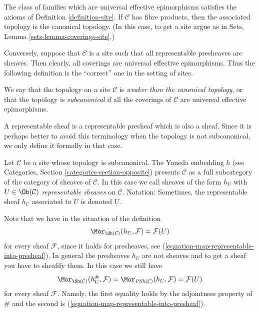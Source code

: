 \noindent
The class of families which are universal effective epimorphisms
satisfies the axioms of Definition \ref{definition-site}.
If $\mathcal{C}$ has fibre products, then the associated topology is
the canonical topology. (In this case, to get a site argue as in Sets,
Lemma \ref{sets-lemma-coverings-site}.)

\medskip\noindent
Conversely, suppose that $\mathcal{C}$ is a site such that
all representable presheaves are sheaves. Then clearly, all
coverings are universal effective epimorphisms.
Thus the following definition is the ``correct'' one in the
setting of sites.

\begin{definition}
\label{definition-weaker-than-canonical}
We say that the topology on a site $\mathcal{C}$ is
{\it weaker than the canonical topology}, or that the topology is
{\it subcanonical} if all the coverings
of $\mathcal{C}$ are universal effective epimorphisms.
\end{definition}

\noindent
A representable sheaf is a representable presheaf which is also a
sheaf. Since it is perhaps better to avoid this terminology when the
topology is not subcanonical, we only define it formally in that case.

\begin{definition}
\label{definition-representable-sheaf}
Let $\mathcal{C}$ be a site whose topology is subcanonical.
The Yoneda embedding $h$ (see
Categories, Section \ref{categories-section-opposite})
presents $\mathcal{C}$ as a full subcategory of the
category of sheaves of $\mathcal{C}$. In this case
we call sheaves of the form $h_U$ with $U \in \Ob(\mathcal{C})$
{\it representable sheaves} on $\mathcal{C}$.
Notation: Sometimes, the representable sheaf $h_U$ associated to $U$ is
denoted {\it $\underline{U}$}.
\end{definition}

\noindent
Note that we have in the situation of the definition
$$
\Mor_{\Sh(\mathcal{C})}(h_U, \mathcal{F}) = \mathcal{F}(U)
$$
for every sheaf $\mathcal{F}$, since it holds for presheaves, see
(\ref{equation-map-representable-into-presheaf}). In general the
presheaves $h_U$ are not sheaves and to get a sheaf you have to
sheafify them. In this case we still have
\begin{equation}
\label{equation-map-representable-into-sheaf}
\Mor_{\Sh(\mathcal{C})}(h_U^\#, \mathcal{F}) =
\Mor_{\textit{PSh}(\mathcal{C})}(h_U, \mathcal{F}) =
\mathcal{F}(U)
\end{equation}
for every sheaf $\mathcal{F}$. Namely, the first equality holds
by the adjointness property of $\#$ and the second is
(\ref{equation-map-representable-into-presheaf}).

